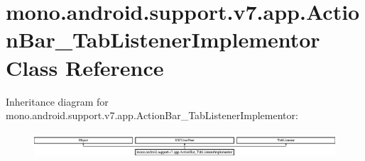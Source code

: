 \hypertarget{classmono_1_1android_1_1support_1_1v7_1_1app_1_1ActionBar__TabListenerImplementor}{}\section{mono.\+android.\+support.\+v7.\+app.\+Action\+Bar\+\_\+\+Tab\+Listener\+Implementor Class Reference}
\label{classmono_1_1android_1_1support_1_1v7_1_1app_1_1ActionBar__TabListenerImplementor}
Inheritance diagram for mono.\+android.\+support.\+v7.\+app.\+Action\+Bar\+\_\+\+Tab\+Listener\+Implementor\+:\begin{figure}[H]
\begin{center}
\leavevmode
\includegraphics[height=0.967185cm]{classmono_1_1android_1_1support_1_1v7_1_1app_1_1ActionBar__TabListenerImplementor}
\end{center}
\end{figure}
